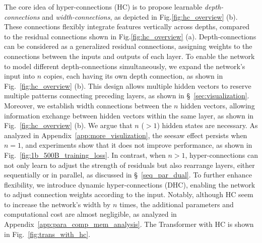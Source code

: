 \documentclass{article} %
\newcommand{\newtext}[1]{\textcolor{red}{#1}}
\renewcommand{\newtext}[1]{#1}
\begin{document}
\newtext{The core idea of hyper-connections (HC) is to propose learnable \textit{depth-connections} and \textit{width-connections}, as depicted in Fig.\ref{fig:hc_overview} (b). These connections flexibly integrate features vertically across depths, compared to the residual connections shown in Fig.\ref{fig:hc_overview} (a). Depth-connections can be considered as a generalized residual connections, assigning weights to the connections between the inputs and outputs of each layer. To enable the network to model different depth-connections simultaneously, we expand the network's input into $n$ copies, each having its own depth connection, as shown in Fig.~\ref{fig:hc_overview} (b). This design allows 
 multiple hidden vectors to reserve multiple patterns connecting preceding layers, as shown in \S~\ref{sec:visualization}. Moreover, we establish width connections between the $n$ hidden vectors, allowing information exchange between hidden vectors within the same layer, as shown in Fig.~\ref{fig:hc_overview} (b). We argue that $n$ ($>1$) hidden states are necessary. As analyzed in Appendix~\ref{app:more_visulization}, the seesaw effect persists when $n=1$, and experiments show that it does not improve performance, as shown in Fig.~\ref{fig:1b_500B_training_loss}. In contrast, when $n>1$, hyper-connections can not only learn to adjust the strength of residuals but also rearrange layers, either sequentially or in parallel, as discussed in \S~\ref{seq_par_dual}. To further enhance flexibility, we introduce dynamic hyper-connections (DHC), enabling the network to adjust connection weights according to the input.
Notably, although HC seem to increase the network's width by $n$ times, the additional parameters and computational cost are almost negligible, as analyzed in Appendix~\ref{app:para_comp_mem_analysis}. The Transformer with HC is shown in Fig.~\ref{fig:trans_with_hc}.}
\end{document}
